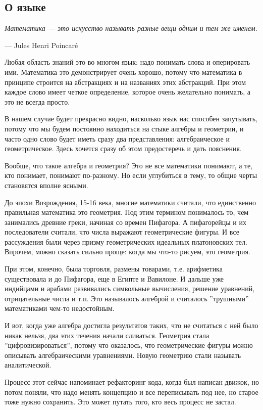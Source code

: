 \documentclass[a4paper,12pt]{article}
\begin{document}
\subsection*{О языке}
\epigraph{\textit{Математика — это искусство называть разные вещи одним и тем же именем.}}{— Jules Henri Poincaré}
Любая область знаний это во многом язык: надо понимать слова и оперировать ими. Математика это демонстрирует очень хорошо, потому что математика в принципе строится на абстракциях и на названиях этих абстракций. При этом каждое слово имеет четкое определение, которое очень желательно понимать, а это не всегда просто.

В нашем случае будет прекрасно видно, насколько язык нас способен запутывать, потому что мы будем постоянно находиться на стыке алгебры и геометрии, и часто одно слово будет иметь сразу два представления: алгебраическое и геометрическое. Здесь хочется сразу об этом предостеречь и дать пояснения.

Вообще, что такое алгебра и геометрия? Это не все математики понимают, а те, кто понимает, понимают по-разному. Но если углубиться в тему, то общие черты становятся вполне ясными.

До эпохи Возрождения, 15-16 века, многие математики считали, что единственно правильная математика это геометрия. Под этим термином понималось то, чем занимались древние греки, начиная со времен Пифагора. А пифагорейцы и их последователи считали, что числа выражают геометрические фигуры. И все рассуждения были через призму геометрических идеальных платоновских тел. Впрочем, можно сказать сильно проще: когда мы что-то рисуем, это геометрия.

При этом, конечно, была торговля, размены товарами, т.е. арифметика существовала и до Пифагора, еще в Египте и Вавилоне. И дальше уже индийцами и арабами развивались символьные вычисления, решение уравнений, отрицательные числа и т.п. Это называлось алгеброй и считалось ''трушными'' математиками чем-то недостойным.

И вот, когда уже алгебра достигла результатов таких, что не считаться с ней было никак нельзя, два этих течения начали сливаться. Геометрия стала ''цифровизироваться'', потому что оказалось, что геометрические фигуры можно описывать алгебраическими уравнениями. Новую геометрию стали называть аналитической.

Процесс этот сейчас напоминает рефакторинг кода, когда был написан движок, но потом поняли, что надо менять концепцию и все переписывать под нее, но старое тоже нужно сохранить. Это может путать того, кто весь процесс не застал.
\end{document}
